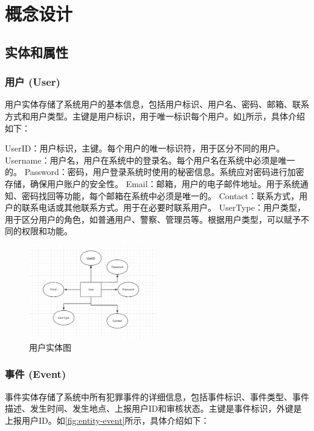 \section{概念设计}

\subsection{实体和属性}

\subsubsection{用户 (User)}

用户实体存储了系统用户的基本信息，包括用户标识、用户名、密码、邮箱、联系方式和用户类型。主键是用户标识，用于唯一标识每个用户。如\cref{fig:entity-user}所示，具体介绍如下：

UserID：用户标识，主键。每个用户的唯一标识符，用于区分不同的用户。
Username：用户名，用户在系统中的登录名。每个用户名在系统中必须是唯一的。
Password：密码，用户登录系统时使用的秘密信息。系统应对密码进行加密存储，确保用户账户的安全性。
Email：邮箱，用户的电子邮件地址。用于系统通知、密码找回等功能，每个邮箱在系统中必须是唯一的。
Contact：联系方式，用户的联系电话或其他联系方式。用于在必要时联系用户。
UserType：用户类型，用于区分用户的角色，如普通用户、警察、管理员等。根据用户类型，可以赋予不同的权限和功能。

\begin{figure}[htbp]
    \centering
    \includegraphics[width=0.5\textwidth]{figures/db-img-01.png}
    \caption{用户实体图}
    \label{fig:entity-user}
\end{figure}

\subsubsection{事件 (Event)}

事件实体存储了系统中所有犯罪事件的详细信息，包括事件标识、事件类型、事件描述、发生时间、发生地点、上报用户ID和审核状态。主键是事件标识，外键是上报用户ID。如\cref{fig:entity-event}所示，具体介绍如下：

